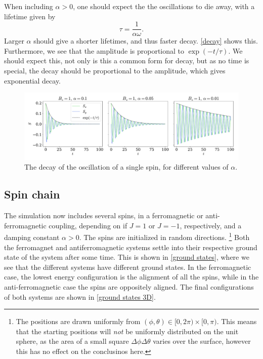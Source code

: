 \documentclass{article}
\begin{document}
    When including $\alpha > 0$, one should expect the the oscillations to die away, with a lifetime given by
    \begin{equation*}
        \tau = \frac{1}{\alpha \omega}.
    \end{equation*}
    Larger $\alpha$ should give a shorter lifetimes, and thus faster decay.
    \autoref{decay} shows this.
    Furthermore, we see that the amplitude is proportional to $\exp(-t/\tau)$.
    We should expect this, not only is this a common form for decay, but as no time is special, the decay should be proportional to the amplitude, which gives exponential decay.

    \begin{figure}[H]
        \centering
        \includegraphics[width=\textwidth]{../plots/decay_a.pdf}
        \caption{The decay of the oscillation of a single spin, for different values of $\alpha$.}
        \label{decay}
    \end{figure}

    \subsection*{Spin chain}
    The simulation now includes several spins, in a ferromagnetic or anti-ferromagnetic coupling, depending on if $J = 1$ or $J = -1$, respectively, and a damping constant $\alpha > 0$.
    The spins are initialized in random directions.
    \footnote{The positions are drawn uniformly from $(\phi, \theta)\in[0, 2\pi)\times[0, \pi)$. 
    This means that the starting positions will \emph{not} be uniformly distributed on the unit sphere, as the area of a small square $\Delta \phi \Delta \theta$ varies over the surface, however this has no effect on the conclusinos here.}
    Both the ferromagnet and antiferromagnetic systems settle into their respective ground state of the system after some time.
    This is shown in \autoref{ground states}, where we see that the different systems have different ground states.
    In the ferromagnetic case, the lowest energy configuration is the alignment of all the spins, while in the anti-ferromagnetic case the spins are oppositely aligned.
    The final configurations of both systems are shown in \autoref{ground states 3D}.
\end{document}
